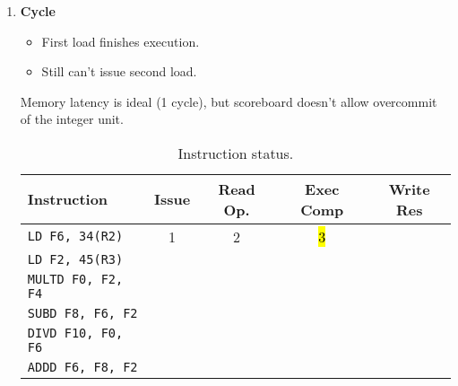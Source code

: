 \begin{enumerate}
    \newpage


    \item \textbf{Cycle \theenumi}
    \begin{itemize}
        \item First load finishes execution.
        \item Still can't issue second load.
    \end{itemize}
    Memory latency is ideal (1 cycle), but scoreboard doesn't allow overcommit of the integer unit.

    \begin{table}[!htp]
        \centering
        \begin{tabular}{@{} l | c c c c @{}}
            \toprule
            Instruction                 & Issue & Read Op.  & Exec Comp & Write Res \\
            \midrule
            \texttt{LD    F6, 34(R2)}   & 1     & 2         & \hl{3}    &           \\ [.3em]
            \texttt{LD    F2, 45(R3)}   &       &           &           &           \\ [.3em]
            \texttt{MULTD F0, F2, F4}   &       &           &           &           \\ [.3em]
            \texttt{SUBD  F8, F6, F2}   &       &           &           &           \\ [.3em]
            \texttt{DIVD  F10, F0, F6}  &       &           &           &           \\ [.3em]
            \texttt{ADDD  F6, F8, F2}   &       &           &           &           \\
            \bottomrule
        \end{tabular}
        \caption*{Instruction status.}
    \end{table}


\end{enumerate}
